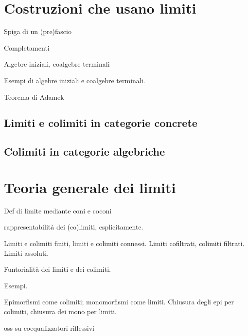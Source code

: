 \section{Costruzioni che usano limiti}
\begin{example}
	Spiga di un (pre)fascio
\end{example}
\begin{example}
	Completamenti
\end{example}
\begin{example}
	Algebre iniziali, coalgebre terminali
\end{example}
\begin{examples}
	Esempi di algebre iniziali e coalgebre terminali.
\end{examples}
\begin{theorem}
	Teorema di Adamek
\end{theorem}
\subsection{Limiti e colimiti in categorie concrete}
\subsection{Colimiti in categorie algebriche}
\begin{esercizi}
	\item
	\item
	\item
	\item
	\item
\end{esercizi}

\section{Teoria generale dei limiti}

Def di limite mediante coni e coconi

rappresentabilità dei (co)limiti, esplicitamente.

Limiti e colimiti finiti, limiti e colimiti connessi.
Limiti cofiltrati, colimiti filtrati.
Limiti assoluti.

Funtorialità dei limiti e dei colimiti.

Esempi.

Epimorfismi come colimiti; monomorfismi come limiti. Chiusura degli epi per colimiti, chiusura dei mono per limiti.

oss su coequalizzatori riflessivi



